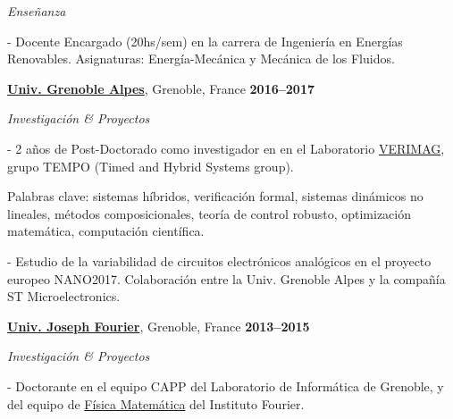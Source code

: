 \documentclass[10pt]{article}
\newenvironment{outerlist}[1][\enskip\textbullet]%
        {\begin{itemize}[#1]}{\end{itemize}%
         \vspace{-.6\baselineskip}}
\newenvironment{innerlist}[1][\enskip\textbullet]%
        {\begin{compactitem}[#1]}{\end{compactitem}}
\newcommand{\blankline}{\quad\pagebreak[2]}
\begin{document}
\begin{outerlist}
	\item[]\textit{Enseñanza}
	\begin{innerlist}
		\item[-] Docente Encargado (20hs/sem) en la carrera de Ingeniería en Energías Renovables. Asignaturas: Energía-Mecánica y Mecánica de los Fluidos.
	\end{innerlist}
\end{outerlist}

\blankline

\href{http://www.ujf-grenoble.fr/}{\textbf{Univ. Grenoble Alpes}}, Grenoble, France
\hfill\textbf{2016--2017}

\begin{outerlist}
	\item[]\textit{Investigación \& Proyectos}
	\begin{innerlist}
		\item[-] 2 años de Post-Doctorado como investigador en en el Laboratorio \href{http://www-verimag.imag.fr/?lang=en}{VERIMAG}, grupo TEMPO (Timed and Hybrid Systems group). 
		
		Palabras clave: sistemas híbridos, verificación formal, sistemas dinámicos no lineales, métodos composicionales, teoría de control robusto, optimización matemática, computación científica.
		\item[-] Estudio de la variabilidad de circuitos electrónicos analógicos en el proyecto europeo NANO2017. Colaboración entre la Univ. Grenoble Alpes y la compañía ST Microelectronics.
	\end{innerlist}
\end{outerlist}

\blankline

\href{http://www.ujf-grenoble.fr/}{\textbf{Univ. Joseph Fourier}}, Grenoble, France
\hfill\textbf{2013--2015}

\begin{outerlist}
\item[]\textit{Investigación \& Proyectos}
\begin{innerlist}
\item[-] Doctorante en el equipo CAPP del Laboratorio de Informática de Grenoble, y del equipo de \href{http://www-fourier.ujf-grenoble.fr/?q=fr/content/physique-mathematique}{Física Matemática} del Instituto Fourier.
\end{innerlist}
\end{outerlist}

\blankline
\end{document}
